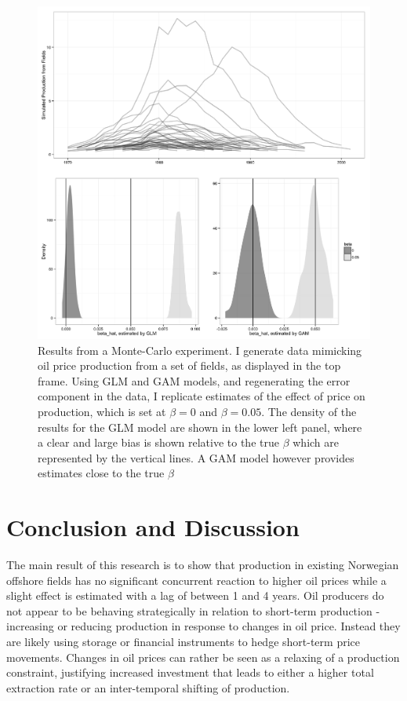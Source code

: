 \documentclass[11pt]{article}
\begin{document}
\begin{figure}
	\includegraphics[width=1\textwidth]{figures/mc_plot.png}
	\caption{Results from a Monte-Carlo experiment. I generate data mimicking oil price production from a set of fields, as displayed in the top frame. Using GLM and GAM models, and regenerating the error component in the data, I replicate estimates of the effect of price on production, which is set at $\beta = 0$ and $\beta=0.05$. The density of the results for the GLM model are shown in the lower left panel, where a clear and large bias is shown relative to the true $\beta$ which are represented by the vertical lines.  A GAM model however provides estimates close to the true $\beta$}
	\label{mc_results}
\end{figure}

\section{Conclusion and Discussion}

The main result of this research is to show that production in existing Norwegian offshore fields has no significant concurrent reaction to higher oil prices while a slight effect is estimated  with a lag of between 1 and 4 years.  Oil producers do not appear to be behaving strategically in relation to short-term production - increasing or reducing production in response to changes in oil price.  Instead they are likely using storage or financial instruments to hedge short-term price movements. Changes in oil prices can rather be seen as a relaxing of a production constraint, justifying increased investment that leads to either a higher total extraction rate or an inter-temporal shifting of production.
\end{document}
